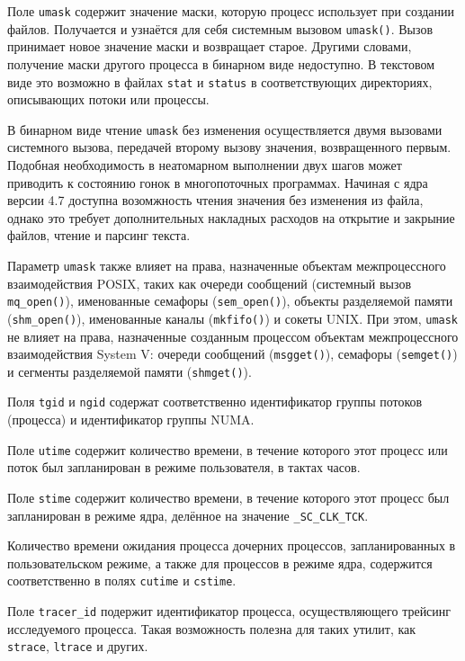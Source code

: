 Поле \texttt{umask} содержит значение маски, которую процесс использует при
создании файлов. Получается и узнаётся для себя системным вызовом
\texttt{umask()}. Вызов принимает новое значение маски и возвращает старое.
Другими словами, получение маски другого процесса в бинарном виде недоступно.
В текстовом виде это возможно в файлах \texttt{stat} и \texttt{status} в
соответствующих директориях, описывающих потоки или процессы.

В бинарном виде чтение \texttt{umask} без изменения осуществляется двумя
вызовами системного вызова, передачей второму вызову значения, возвращенного
первым. Подобная необходимость в неатомарном выполнении двух шагов может
приводить к состоянию гонок в многопоточных программах. Начиная с ядра версии
4.7 доступна возомжность чтения значения без изменения из файла, однако это
требует дополнительных накладных расходов на открытие и закрыние файлов, чтение
и парсинг текста.

Параметр \texttt{umask} также влияет на права, назначенные объектам
межпроцессного взаимодействия POSIX, таких как очереди сообщений (системный
вызов \texttt{mq\_open()}), именованные семафоры (\texttt{sem\_open()}),
объекты разделяемой памяти (\texttt{shm\_open()}), именованные каналы
(\texttt{mkfifo()}) и сокеты UNIX. При этом, \texttt{umask} не влияет на права,
назначенные созданным процессом объектам межпроцессного взаимодействия System V:
очереди сообщений (\texttt{msgget()}), семафоры (\texttt{semget()}) и сегменты
разделяемой памяти (\texttt{shmget()}).

Поля \texttt{tgid} и \texttt{ngid} содержат соответственно идентификатор группы
потоков (процесса) и идентификатор группы NUMA.

Поле \texttt{utime} содержит количество времени, в течение которого этот процесс
или поток был запланирован в режиме пользователя, в тактах часов.

Поле \texttt{stime} содержит количество времени, в течение которого этот процесс
был запланирован в режиме ядра, делённое на значение \texttt{\_SC\_CLK\_TCK}.

Количество времени ожидания процесса дочерних процессов, запланированных в
пользовательском режиме, а также для процессов в режиме ядра, содержится
соответственно в полях \texttt{cutime} и \texttt{cstime}.

Поле \texttt{tracer\_id} подержит идентификатор процесса, осуществляющего
трейсинг исследуемого процесса. Такая возможность полезна для таких утилит, как
\texttt{strace}, \texttt{ltrace} и других.

